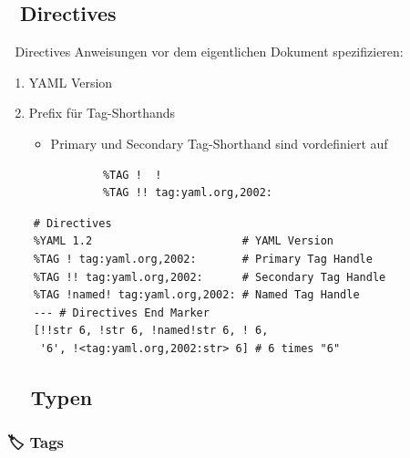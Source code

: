 \documentclass{beamer}
\begin{document}
\subsection{📢 Directives}

\begin{frame}[fragile]{📢 Directives}
  Anweisungen vor dem eigentlichen Dokument spezifizieren:
  \begin{enumerate}
    \item YAML Version 
    \item Prefix für Tag-Shorthands 
    \begin{itemize}
      \item Primary und Secondary Tag-Shorthand sind vordefiniert auf
      \begin{verbatim}
        %TAG !  !
        %TAG !! tag:yaml.org,2002:
      \end{verbatim}
    \end{itemize}
  \end{enumerate}
  \begin{verbatim}
    # Directives
    %YAML 1.2                       # YAML Version
    %TAG ! tag:yaml.org,2002:       # Primary Tag Handle
    %TAG !! tag:yaml.org,2002:      # Secondary Tag Handle
    %TAG !named! tag:yaml.org,2002: # Named Tag Handle
    --- # Directives End Marker
    [!!str 6, !str 6, !named!str 6, ! 6,
     '6', !<tag:yaml.org,2002:str> 6] # 6 times "6"
  \end{verbatim}
\end{frame}

\subsection{🐠🐙🐶 Typen}

\subsubsection{🏷 Tags}
\end{document}
